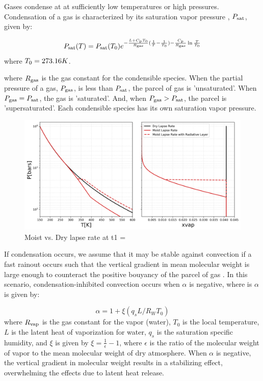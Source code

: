 \documentclass[11pt]{ucscthesisbs}
\begin{document}
Gases condense at at sufficiently low temperatures or high pressures. Condensation of a gas is characterized by its saturation vapor pressure \citep{sanchez_2011}, $P_{\rm sat}$, given by: 

\begin{equation}
  P_{\rm sat}(T) = P_{\rm sat}(T_{\rm 0})e^{-\frac{L + C_{\rm p}T_{\rm 0}}{R_{\rm gas}}(\frac{1}{T} - \frac{1}{T_{\rm 0}}) -\frac{C_{\rm p}}{R_{\rm gas}}\ln{\frac{T}{T_{\rm 0}}}}
\end{equation}
where $T_{\rm 0} = 273.16K$.

where $R_{\rm gas}$ is the gas constant for the condensible species. When the partial pressure of a gas, $P_{\rm gas}$, is less than $P_{\rm sat}$, the parcel of gas is 'unsaturated'. When $P_{\rm gas} = P_{\rm sat}$, the gas is 'saturated'. And, when $P_{\rm gas} > P_{\rm sat}$, the parcel is 'supersaturated'. Each condensible species has its own saturation vapor pressure. 

\begin{figure}[ht!]
 \centerline{
  \includegraphics[width=6.5in]{figures/comparison_dry_vs_moist_lapse_rates.png}
 }
\caption[A Standard Interior Structure Model]
{Moist vs. Dry lapse rate at t1 = }
\label{fig:standard_dry_interior}
\end{figure}


If condensation occurs, we assume that it may be stable against convection if a fast rainout occurs such that the vertical gradient in mean molecular weight is large enough to counteract the positive bouyancy of the parcel of gas \citep{leconte_2017} \citep{friedson_2017}. In this scenario, condensation-inhibited convection occurs when $\alpha$ is negative, where is $\alpha$ \citep{friedson_2017} is given by:

\begin{equation}
  \alpha = 1 + \xi (q_{s} L / R_{W} T_{0}) 
  \label{eq:alpha}
\end{equation}
where $R_{\rm vap}$ is the gas constant for the vapor (water), $T_{0}$ is the local temperature, $L$ is the latent heat of vaporization for water, $q_{s}$ is the saturation specific humidity, and $\xi$ is given by $\xi = \frac{1}{\epsilon} - 1$, where $\epsilon$ is the ratio of the molecular weight of vapor to the mean molecular weight of dry atmosphere. When $\alpha$ is negative, the vertical gradient in molecular weight results in a stabilizing effect, overwhelming the effects due to latent heat release.
\end{document}
